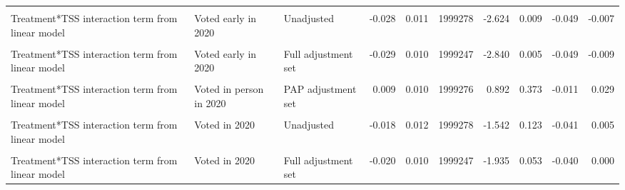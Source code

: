 \begin{table}
\begin{tabular}[t]{lllrrrrrrr}
\cellcolor{gray!10}{Difference-in-CATEs TSS 60-70 versus TSS 30-40} & \cellcolor{gray!10}{Voted in 2020} & \cellcolor{gray!10}{Full adjustment set} & \cellcolor{gray!10}{-0.008} & \cellcolor{gray!10}{0.003} & \cellcolor{gray!10}{1035542} & \cellcolor{gray!10}{-2.268} & \cellcolor{gray!10}{0.023} & \cellcolor{gray!10}{-0.014} & \cellcolor{gray!10}{-0.001}\\
Treatment*TSS interaction term from linear model & Voted early in 2020 & Unadjusted & -0.028 & 0.011 & 1999278 & -2.624 & 0.009 & -0.049 & -0.007\\
\cellcolor{gray!10}{Treatment*TSS interaction term from linear model} & \cellcolor{gray!10}{Voted early in 2020} & \cellcolor{gray!10}{PAP adjustment set} & \cellcolor{gray!10}{-0.028} & \cellcolor{gray!10}{0.010} & \cellcolor{gray!10}{1999276} & \cellcolor{gray!10}{-2.712} & \cellcolor{gray!10}{0.007} & \cellcolor{gray!10}{-0.048} & \cellcolor{gray!10}{-0.008}\\
Treatment*TSS interaction term from linear model & Voted early in 2020 & Full adjustment set & -0.029 & 0.010 & 1999247 & -2.840 & 0.005 & -0.049 & -0.009\\
\cellcolor{gray!10}{Treatment*TSS interaction term from linear model} & \cellcolor{gray!10}{Voted in person in 2020} & \cellcolor{gray!10}{Unadjusted} & \cellcolor{gray!10}{0.010} & \cellcolor{gray!10}{0.011} & \cellcolor{gray!10}{1999278} & \cellcolor{gray!10}{0.897} & \cellcolor{gray!10}{0.370} & \cellcolor{gray!10}{-0.012} & \cellcolor{gray!10}{0.031}\\
Treatment*TSS interaction term from linear model & Voted in person in 2020 & PAP adjustment set & 0.009 & 0.010 & 1999276 & 0.892 & 0.373 & -0.011 & 0.029\\
\cellcolor{gray!10}{Treatment*TSS interaction term from linear model} & \cellcolor{gray!10}{Voted in person in 2020} & \cellcolor{gray!10}{Full adjustment set} & \cellcolor{gray!10}{0.009} & \cellcolor{gray!10}{0.010} & \cellcolor{gray!10}{1999247} & \cellcolor{gray!10}{0.907} & \cellcolor{gray!10}{0.365} & \cellcolor{gray!10}{-0.011} & \cellcolor{gray!10}{0.029}\\
Treatment*TSS interaction term from linear model & Voted in 2020 & Unadjusted & -0.018 & 0.012 & 1999278 & -1.542 & 0.123 & -0.041 & 0.005\\
\cellcolor{gray!10}{Treatment*TSS interaction term from linear model} & \cellcolor{gray!10}{Voted in 2020} & \cellcolor{gray!10}{PAP adjustment set} & \cellcolor{gray!10}{-0.019} & \cellcolor{gray!10}{0.010} & \cellcolor{gray!10}{1999276} & \cellcolor{gray!10}{-1.826} & \cellcolor{gray!10}{0.068} & \cellcolor{gray!10}{-0.039} & \cellcolor{gray!10}{0.001}\\
Treatment*TSS interaction term from linear model & Voted in 2020 & Full adjustment set & -0.020 & 0.010 & 1999247 & -1.935 & 0.053 & -0.040 & 0.000\\
\bottomrule
\end{tabular}
\end{table}
